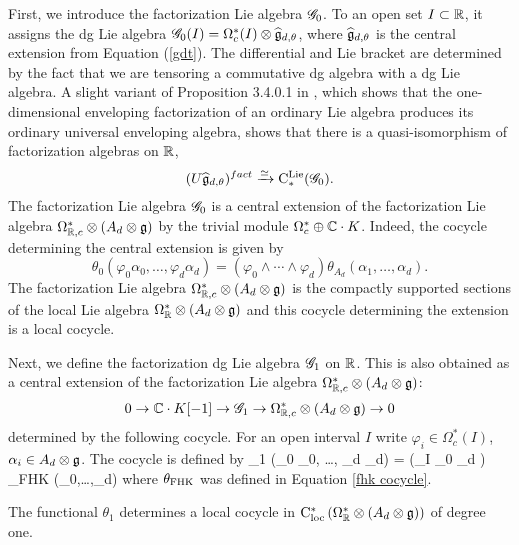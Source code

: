 \documentclass[10pt]{amsart}
\begin{document}
First, we introduce the factorization Lie algebra $\mathscr G_0$. 
To an open set $I \subset \mathbb R$, it assigns the dg Lie algebra $\mathscr G_0(I) = \Omega^*_{c}(I) \otimes \widehat{\mathfrak g}_{d,\theta}$, where $\widehat{\mathfrak g}_{d,\theta}$ is the central extension from Equation (\ref{gdt}). The differential and Lie bracket are determined by the fact that we are tensoring a commutative dg algebra with a dg Lie algebra. A slight variant of Proposition 3.4.0.1 in \cite{CG1}, which shows that the one-dimensional enveloping factorization of an ordinary Lie algebra produces its ordinary universal enveloping algebra, shows that there is a quasi-isomorphism of factorization algebras on $\mathbb R$,
\[
(U \widehat{\mathfrak g}_{d,\theta})^{fact} \xrightarrow{\simeq} {\rm C}^{\rm Lie}_*(\mathscr G_0) .
\]
The factorization Lie algebra $\mathscr G_0$ is a central extension of the factorization Lie algebra $\Omega^*_{\mathbb R,c} \otimes (A_d \otimes \mathfrak g)$ by the trivial module $\Omega^*_c \oplus \mathbb C \cdot K$. Indeed, the cocycle determining the central extension is given by
\[
\theta_0 (\varphi_0 \alpha_0,\ldots,\varphi_d \alpha_d) = (\varphi_0 \wedge \cdots \wedge \varphi_d) \theta_{A_d}(\alpha_1,\ldots,\alpha_d) .
\] 
The factorization Lie algebra $\Omega^*_{\mathbb R,c} \otimes (A_d \otimes \mathfrak g)$ is the compactly supported sections of the local Lie algebra $\Omega^*_{\mathbb R} \otimes (A_d \otimes \mathfrak g)$ and this cocycle determining the extension is a local cocycle. 

Next, we define the factorization dg Lie algebra $\mathscr G_1$ on $\mathbb R$. This is also obtained as a central extension of the factorization Lie algebra $\Omega^{*}_{\mathbb R,c} \otimes (A_d \otimes \mathfrak g)$: 
\[
0 \to \mathbb C \cdot K [-1] \to \mathscr G_1 \to \Omega^{*}_{\mathbb R,c} \otimes (A_d \otimes \mathfrak g) \to 0
\]
determined by the following cocycle. For an open interval $I$ write $\varphi_i \in \Omega^*_c(I)$, $\alpha_i\in A_d \otimes \mathfrak g$. The cocycle is defined by
\beqn\label{cocycle 1}
\theta_1 (\varphi_0 \alpha_0, \ldots, \varphi_d \alpha_d) =  \left(\int_{I} \varphi_0 \wedge \cdots \varphi_d \right) \theta_{\rm FHK} (\alpha_0,\ldots,\alpha_d)
\eeqn
where $\theta_{\rm FHK}$ was defined in Equation \ref{fhk cocycle}.

The functional $\theta_1$ determines a local cocycle in ${\rm C}_{\rm loc}^*\left(\Omega^*_\mathbb R \otimes (A_d \otimes \mathfrak g)\right)$ of degree one. 

\def\dR{{\rm dR}}
\end{document}
